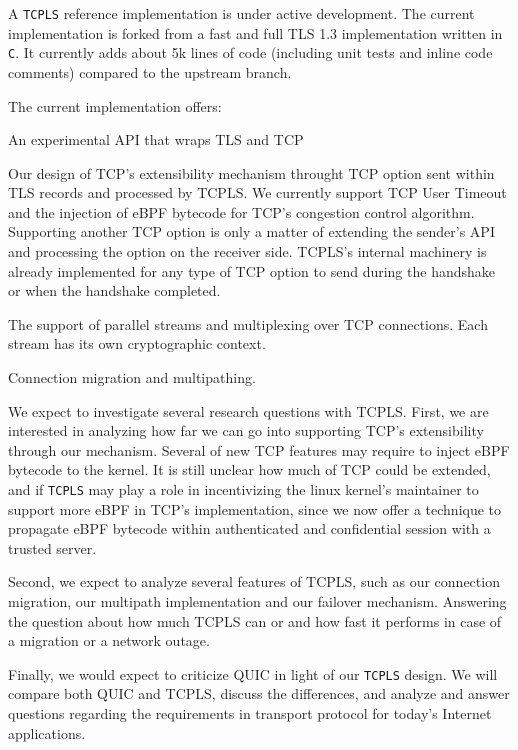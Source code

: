 
A \texttt{TCPLS} reference implementation is under active development. The
current implementation is forked from a fast and full
TLS 1.3 implementation written in \texttt{C}. It currently adds about 5k lines
of code (including unit tests and inline code comments) compared to the upstream branch.

The current implementation offers:
\begin{inparaenum}
  \item An experimental API that wraps TLS and TCP
  \item Our design of TCP's extensibility mechanism throught TCP option sent
within TLS records and processed by TCPLS. We currently support TCP User
Timeout and the injection of eBPF bytecode for TCP's congestion control
algorithm. Supporting another TCP option is only a matter of extending the sender's
API and processing the option
on the receiver side. TCPLS's internal machinery is already implemented for any
type of TCP option to send during the handshake or when the handshake completed.
  \item The support of parallel streams and multiplexing over TCP connections.
    Each stream has its own cryptographic context.
  \item Connection migration and multipathing.
\end{inparaenum}

We expect to investigate several research questions with TCPLS. First, we are
interested in analyzing how far we can go into supporting TCP's extensibility
through our mechanism. Several of new TCP features may require to inject eBPF
bytecode to the kernel. It is still unclear how much of TCP could be extended,
and if \texttt{TCPLS} may play a role in incentivizing the linux kernel's maintainer
to support more eBPF in TCP's implementation, since we now offer a technique to
propagate eBPF bytecode within authenticated and confidential session with a
trusted server.

Second, we expect to analyze several features of TCPLS, such as our
connection migration, our multipath implementation and our failover mechanism.
Answering the question about how much TCPLS can or and how fast it performs in
case of a migration or a network outage.

Finally, we would expect to criticize QUIC in light of our \texttt{TCPLS}
design. We will compare both QUIC and TCPLS, discuss the differences, and analyze
and answer questions regarding the requirements in transport protocol for today's
Internet applications.
